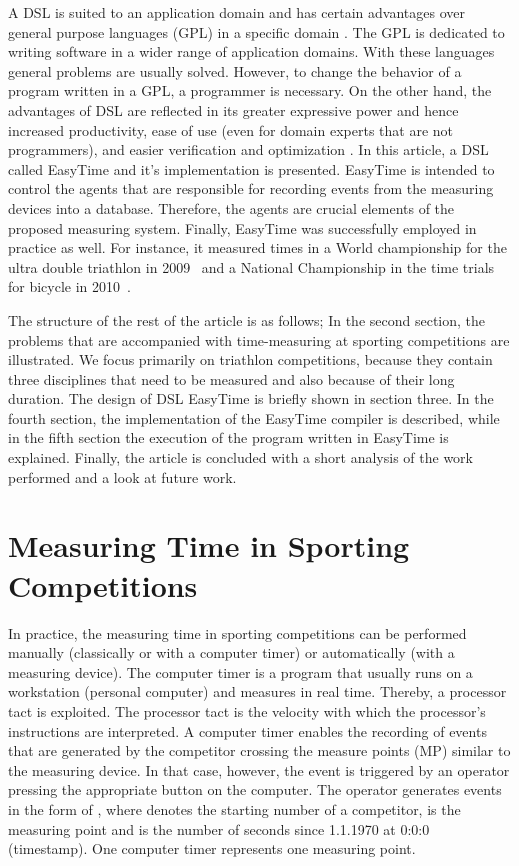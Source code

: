 \documentclass[preprint, prX]{revtex4}
\begin{document}
A DSL is suited to an application domain and has certain advantages over general purpose languages (GPL) in a specific domain
\cite{Kosar:2010,Mernik:2005}. The GPL is dedicated to writing software in a wider range of application domains. With these languages
general problems are usually solved. However, to change the behavior of a program written in a GPL, a programmer is necessary. On the
other hand, the advantages of DSL are reflected in its greater expressive power and hence increased productivity, ease of use (even for domain experts that are not programmers), and easier verification and optimization \cite{Mernik:2005}. In this article, a DSL called EasyTime and it's implementation is presented. EasyTime is intended to control the agents that are responsible for recording events from the measuring devices into a database. Therefore, the agents are crucial elements of the proposed measuring system. Finally,
EasyTime was successfully employed in practice as well. For instance, it measured times in a World championship for the ultra double
triathlon in 2009~\cite{Fister:2011} and a National Championship in the time trials for bicycle in 2010~\cite{Fister:2011}.

The structure of the rest of the article is as follows; In the second section, the problems that are accompanied with time-measuring at sporting competitions are illustrated. We focus primarily on triathlon competitions, because they contain three disciplines that
need to be measured and also because of their long duration. The design of DSL EasyTime is briefly shown in section three. In the fourth section, the implementation of the EasyTime compiler is described, while in the fifth section the execution of the program written in
EasyTime is explained. Finally, the article is concluded with a short analysis of the work performed and a look at future work.

\section{Measuring Time in Sporting Competitions}
In practice, the measuring time in sporting competitions can be performed manually (classically or with a computer timer) or automatically (with a measuring device). The computer timer is a program that usually runs on a workstation (personal computer) and measures in real time. Thereby, a processor tact is exploited. The processor tact is the velocity with which the processor's instructions are interpreted. A computer timer enables the recording of events that are generated by the competitor crossing the measure points (MP) similar to the measuring device. In that case, however, the event is triggered by an operator pressing the appropriate button on the computer. The operator generates events in the form of , where  denotes the starting number of a competitor,  is the measuring point and  is the number of seconds since 1.1.1970 at 0:0:0 (timestamp). One computer timer represents one measuring point.
\end{document}
